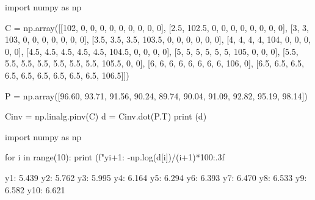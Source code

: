 \cprotEnv\begin{solution}
\begin{ipython}
import numpy as np

C = np.array([[102, 0, 0, 0, 0, 0, 0, 0, 0, 0],
              [2.5, 102.5, 0, 0, 0, 0, 0, 0, 0, 0],
              [3, 3, 103, 0, 0, 0, 0, 0, 0, 0],
              [3.5, 3.5, 3.5, 103.5, 0, 0, 0, 0, 0, 0],
              [4, 4, 4, 4, 104, 0, 0, 0, 0, 0],
              [4.5, 4.5, 4.5, 4.5, 4.5, 104.5, 0, 0, 0, 0],
              [5, 5, 5, 5, 5, 5, 105, 0, 0, 0],
              [5.5, 5.5, 5.5, 5.5, 5.5, 5.5, 5.5, 105.5, 0, 0],
              [6, 6, 6, 6, 6, 6, 6, 6, 106, 0],
              [6.5, 6.5, 6.5, 6.5, 6.5, 6.5, 6.5, 6.5, 6.5, 106.5]])

P = np.array([96.60, 93.71, 91.56, 90.24, 89.74, 
              90.04, 91.09, 92.82, 95.19, 98.14])

Cinv = np.linalg.pinv(C)
d = Cinv.dot(P.T)
print (d)
\end{ipython}
\begin{ioutput}
[0.94705882 0.89114491 0.83539212 0.7814726  0.72999737 0.68140865
 0.63578693 0.59296268 0.55300618 0.51574181]
\end{ioutput}

\begin{ipython}
import numpy as np

for i in range(10):
    print (f"y{i+1}: {-np.log(d[i])/(i+1)*100:.3f}%
\end{ipython}
\begin{ioutput}
y1: 5.439%
y2: 5.762%
y3: 5.995%
y4: 6.164%
y5: 6.294%
y6: 6.393%
y7: 6.470%
y8: 6.533%
y9: 6.582%
y10: 6.621%
\end{ioutput}
\end{solution}
